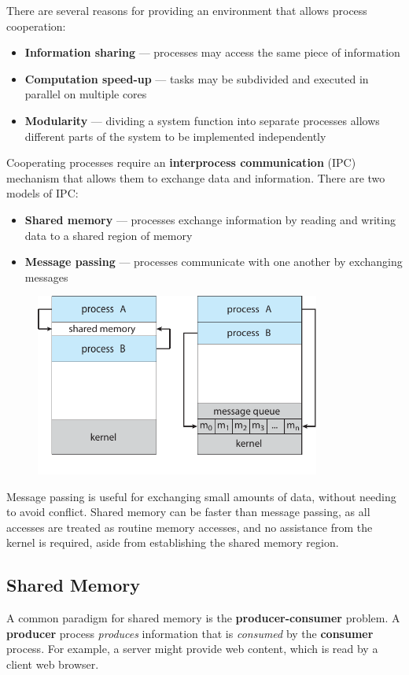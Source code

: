 \documentclass{article}
\begin{document}
There are several reasons for providing an environment that allows
process cooperation:
\begin{itemize}
    \item \textbf{Information sharing} --- processes may access the same
          piece of information
    \item \textbf{Computation speed-up} --- tasks may be subdivided and
          executed in parallel on multiple cores
    \item \textbf{Modularity} --- dividing a system function into
          separate processes allows different parts of the system to be
          implemented independently
\end{itemize}
Cooperating processes require an \textbf{interprocess communication}
(IPC) mechanism that allows them to exchange data and information.
There are two models of IPC:\@
\begin{itemize}
    \item \textbf{Shared memory} --- processes exchange information by
          reading and writing data to a shared region of memory
    \item \textbf{Message passing} --- processes communicate with one
          another by exchanging messages
\end{itemize}
\begin{figure}[H]
    \centering
    \includegraphics[height = 6cm]{figures/ipc_mechanisms.pdf}
\end{figure}
Message passing is useful for exchanging small amounts of data, without
needing to avoid conflict. Shared memory can be faster than message
passing, as all accesses are treated as routine memory accesses, and no
assistance from the kernel is required, aside from establishing the
shared memory region.
\subsection{Shared Memory}
A common paradigm for shared memory is the \textbf{producer-consumer}
problem. A \textbf{producer} process \textit{produces} information that
is \textit{consumed} by the \textbf{consumer} process. For example, a
server might provide web content, which is read by a client web
browser.
\end{document}
